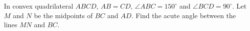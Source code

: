 In convex quadrilateral $ABCD$, $AB=CD$, $\angle ABC=150^\circ$ and $\angle BCD=90^\circ$. Let $M$ and $N$ be the midpoints of $BC$ and $AD$. Find the acute angle between the lines $MN$ and $BC$.
